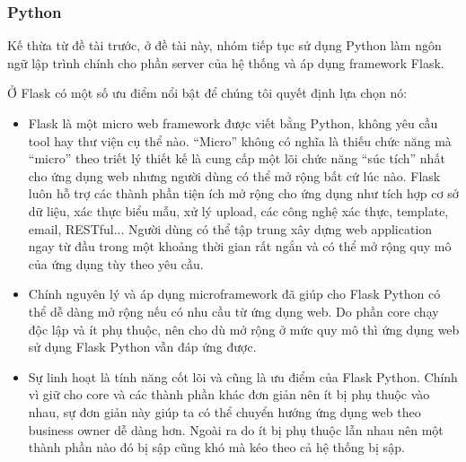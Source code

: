 \subsubsection{Python}
Kế thừa từ đề tài trước, ở đề tài này, nhóm tiếp tục sử dụng Python làm ngôn
ngữ lập trình chính cho phần server của hệ thống và áp dụng framework Flask.
\par
Ở Flask có một số ưu điểm nổi bật để chúng tôi quyết định lựa chọn nó:
\begin{itemize}
    \item Flask là một micro web framework được viết bằng Python, không yêu cầu tool hay
          thư viện cụ thể nào. “Micro” không có nghĩa là thiếu chức năng mà “micro” theo
          triết lý thiết kế là cung cấp một lõi chức năng “súc tích” nhất cho ứng dụng
          web nhưng người dùng có thể mở rộng bất cứ lúc nào. Flask luôn hỗ trợ các thành
          phần tiện ích mở rộng cho ứng dụng như tích hợp cơ sở dữ liệu, xác thực biểu
          mẫu, xử lý upload, các công nghệ xác thực, template, email, RESTful... Người
          dùng có thể tập trung xây dựng web application ngay từ đầu trong một khoảng
          thời gian rất ngắn và có thể mở rộng quy mô của ứng dụng tùy theo yêu cầu.
    \item Chính nguyên lý và áp dụng microframework đã giúp cho Flask Python có thể dễ
          dàng mở rộng nếu có nhu cầu từ ứng dụng web. Do phần core chạy độc lập và ít
          phụ thuộc, nên cho dù mở rộng ở mức quy mô thì ứng dụng web sử dụng Flask
          Python vẫn đáp ứng được.
    \item Sự linh hoạt là tính năng cốt lõi và cũng là ưu điểm của Flask Python. Chính vì
          giữ cho core và các thành phần khác đơn giản nên ít bị phụ thuộc vào nhau, sự
          đơn giản này giúp ta có thể chuyển hướng ứng dụng web theo business owner dễ
          dàng hơn. Ngoài ra do ít bị phụ thuộc lẫn nhau nên một thành phần nào đó bị sập
          cũng khó mà kéo theo cả hệ thống bị sập.
\end{itemize}
